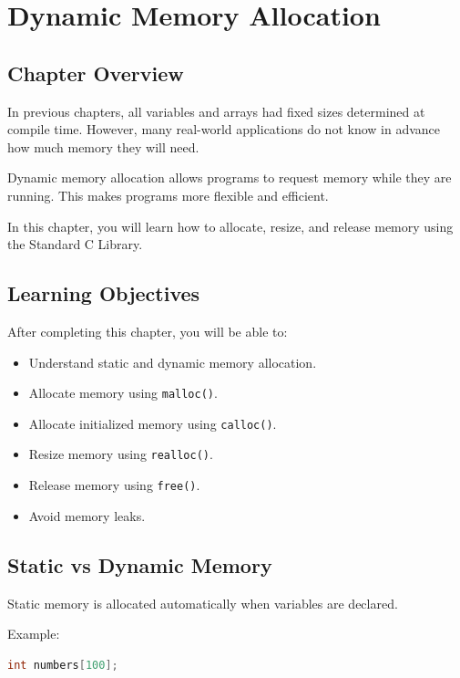 \documentclass[12pt,openany]{book}
\begin{document}
\chapter{Dynamic Memory Allocation}

\section{Chapter Overview}

In previous chapters, all variables and arrays had fixed sizes determined at compile time. However, many real-world applications do not know in advance how much memory they will need.

Dynamic memory allocation allows programs to request memory while they are running. This makes programs more flexible and efficient.

In this chapter, you will learn how to allocate, resize, and release memory using the Standard C Library.

\section{Learning Objectives}

After completing this chapter, you will be able to:

\begin{itemize}
    \item Understand static and dynamic memory allocation.
    \item Allocate memory using \texttt{malloc()}.
    \item Allocate initialized memory using \texttt{calloc()}.
    \item Resize memory using \texttt{realloc()}.
    \item Release memory using \texttt{free()}.
    \item Avoid memory leaks.
\end{itemize}

\section{Static vs Dynamic Memory}

Static memory is allocated automatically when variables are declared.

Example:

\begin{lstlisting}[language=C]
int numbers[100];
\end{lstlisting}
\end{document}
